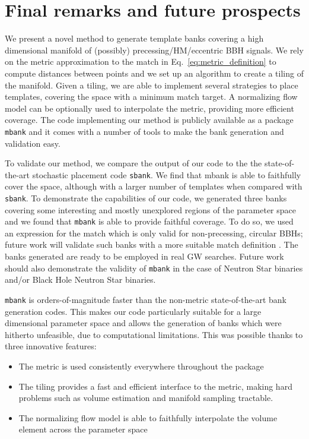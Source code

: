 \documentclass[twocolumn,showpacs,preprintnumbers,nofootinbib,prd,
superscriptaddress,10pt]{revtex4-2}
\begin{document}
\section{Final remarks and future prospects} \label{sec:conclusion}

We present a novel method to generate template banks covering a high dimensional manifold of (possibly) precessing/HM/eccentric BBH signals.
We rely on the metric approximation to the match in Eq.~\eqref{eq:metric_definition} to compute distances between points and we set up an algorithm to create a tiling of the manifold. Given a tiling, we are able to implement several strategies to place templates, covering the space with a minimum match target.
A normalizing flow model can be optionally used to interpolate the metric, providing more efficient coverage.
The code implementing our method is publicly available as a package \texttt{mbank} and it comes with a number of tools to make the bank generation and validation easy.

To validate our method, we compare the output of our code to the the state-of-the-art stochastic placement code \texttt{sbank}. We find that mbank is able to faithfully cover the space, although with a larger number of templates when compared with \texttt{sbank}.
To demonstrate the capabilities of our code, we generated three banks covering some interesting and mostly unexplored regions of the parameter space and we found that \texttt{mbank} is able to provide faithful coverage.
To do so, we used an expression for the match which is only valid for non-precessing, circular BBHs; future work will validate such banks with a more suitable match definition \cite{Harry:2017weg}. The banks generated are ready to be employed in real GW searches.
Future work should also demonstrate the validity of \texttt{mbank} in the case of Neutron Star binaries and/or Black Hole Neutron Star binaries.

\texttt{mbank} is orders-of-magnitude faster than the non-metric state-of-the-art bank generation codes.
This makes our code particularly suitable for a large dimensional parameter space and allows the generation of banks which were hitherto unfeasible, due to computational limitations.
This was possible thanks to three innovative features:
\begin{itemize}
	\item The metric is used consistently everywhere throughout the package
	\item The tiling provides a fast and efficient interface to the metric, making hard problems such as volume estimation and manifold sampling tractable.
	\item The normalizing flow model is able to faithfully interpolate the volume element across the parameter space
\end{itemize}
\end{document}
